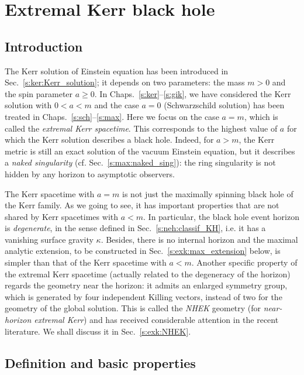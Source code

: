 \chapter{Extremal Kerr black hole}
\label{s:exk}

\minitoc

\section{Introduction}

The Kerr solution of Einstein equation has been introduced in Sec.~\ref{s:ker:Kerr_solution};
it depends on two parameters: the mass $m > 0$ and the spin parameter
$a \geq 0$.
In Chaps.~\ref{s:ker}--\ref{s:gik}, we have considered the Kerr solution with $0<a<m$
and the case $a=0$ (Schwarzschild solution) has been treated in Chaps.~\ref{s:sch}--\ref{s:max}.
Here we focus on the case $a=m$, which is called the \emph{extremal Kerr spacetime}.
This corresponds to the highest value of $a$
for which the Kerr solution describes a black hole.
Indeed, for $a> m$, the Kerr metric is still an exact
solution of the vacuum Einstein equation, but it describes a \emph{naked singularity} (cf. Sec.~\ref{s:max:naked_sing}):
the ring singularity is not hidden by any horizon to asymptotic observers.

The Kerr spacetime with $a=m$ is not just the maximally spinning black hole of the Kerr family.
As we going to see, it has important properties that are not
shared by Kerr spacetimes with $a<m$. In particular, the black hole event horizon is
\emph{degenerate}, in the sense defined in Sec.~\ref{s:neh:classif_KH}, i.e. it has a
vanishing surface gravity $\kappa$. Besides, there is no internal horizon
and the maximal analytic extension, to be constructed in Sec.~\ref{s:exk:max_extension}
below, is simpler than
that of the Kerr spacetime with $a<m$.
Another specific property of the extremal Kerr spacetime (actually related
to the degeneracy of the horizon)
regards the geometry near the horizon: it admits an enlarged
symmetry group, which is generated
by four independent Killing vectors,
instead of two for the geometry of the global solution.
This is called the \emph{NHEK} geometry (for \emph{near-horizon extremal Kerr})
and has received considerable attention in the recent literature. We shall
discuss it in Sec.~\ref{s:exk:NHEK}.



\section{Definition and basic properties}

